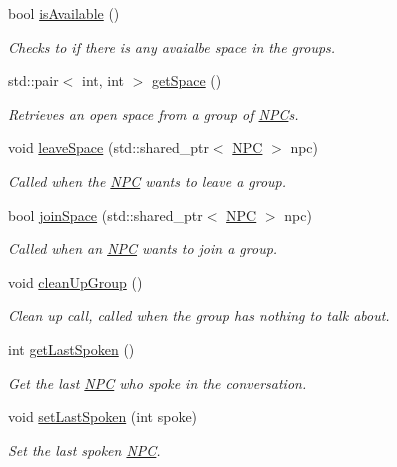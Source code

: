 \begin{DoxyCompactItemize}
bool \hyperlink{class_base___group_a6d806401632aa9f7795984bb2b4880f0}{is\+Available} ()
\begin{DoxyCompactList}\small\item\em Checks to if there is any avaialbe space in the groups. \end{DoxyCompactList}\item 
std\+::pair$<$ int, int $>$ \hyperlink{class_base___group_a4f6559c7a35e04e6355454df2e3be3b2}{get\+Space} ()
\begin{DoxyCompactList}\small\item\em Retrieves an open space from a group of \hyperlink{class_n_p_c}{N\+PC}\textquotesingle{}s. \end{DoxyCompactList}\item 
void \hyperlink{class_base___group_a0928f2c23abc827f6d387a5597324f6e}{leave\+Space} (std\+::shared\+\_\+ptr$<$ \hyperlink{class_n_p_c}{N\+PC} $>$ npc)
\begin{DoxyCompactList}\small\item\em Called when the \hyperlink{class_n_p_c}{N\+PC} wants to leave a group. \end{DoxyCompactList}\item 
bool \hyperlink{class_base___group_a76d7d9c0f35019dfaf7b2631eda863e1}{join\+Space} (std\+::shared\+\_\+ptr$<$ \hyperlink{class_n_p_c}{N\+PC} $>$ npc)
\begin{DoxyCompactList}\small\item\em Called when an \hyperlink{class_n_p_c}{N\+PC} wants to join a group. \end{DoxyCompactList}\item 
void \hyperlink{class_base___group_adebda6363b9f9097a8c866398e20f3c3}{clean\+Up\+Group} ()
\begin{DoxyCompactList}\small\item\em Clean up call, called when the group has nothing to talk about. \end{DoxyCompactList}\item 
int \hyperlink{class_base___group_a8fb88afb104365ec23447ee1f3649b4c}{get\+Last\+Spoken} ()
\begin{DoxyCompactList}\small\item\em Get the last \hyperlink{class_n_p_c}{N\+PC} who spoke in the conversation. \end{DoxyCompactList}\item 
void \hyperlink{class_base___group_a07e58c944f222f5c3d3b33c8adf83d14}{set\+Last\+Spoken} (int spoke)
\begin{DoxyCompactList}\small\item\em Set the last spoken \hyperlink{class_n_p_c}{N\+PC}. \end{DoxyCompactList}\item 

\end{DoxyCompactItemize}
